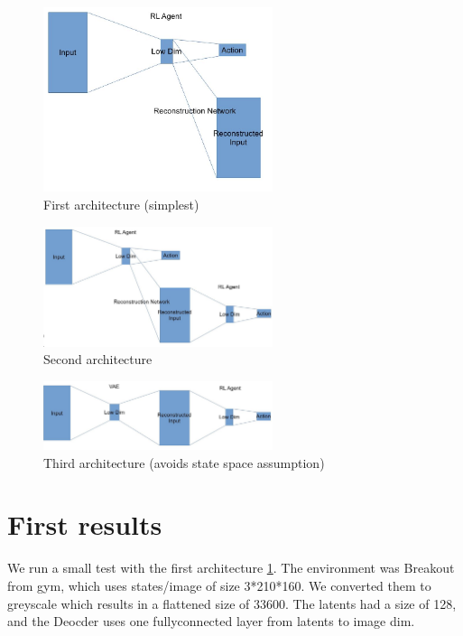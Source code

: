 \documentclass[a4paper]{scrartcl}
\begin{document}
\begin{figure}[H]
    \centering
    \includegraphics[width=0.6\textwidth]{Arch1.JPG}
    \caption{First architecture (simplest)}
    \label{fig:arch1}
\end{figure}
\begin{figure}[H]
    \centering
    \includegraphics[width=0.6\textwidth]{Arch2.JPG}
    \caption{Second architecture}
    \label{fig:arch2}
\end{figure}
\begin{figure}[H]
    \centering
    \includegraphics[width=0.6\textwidth]{Arch3.JPG}
    \caption{Third architecture (avoids state space assumption)}
    \label{fig:arch3}
\end{figure}

\section{First results}
  We run a small test with the first architecture \ref{fig:arch1}. The
  environment was Breakout from gym, which uses states/image of size 3*210*160.
  We converted them to greyscale which results in a flattened size of 33600. The
  latents had a size of 128, and the Deocder uses one fullyconnected layer from
  latents to image dim.\\
  
\end{document}
